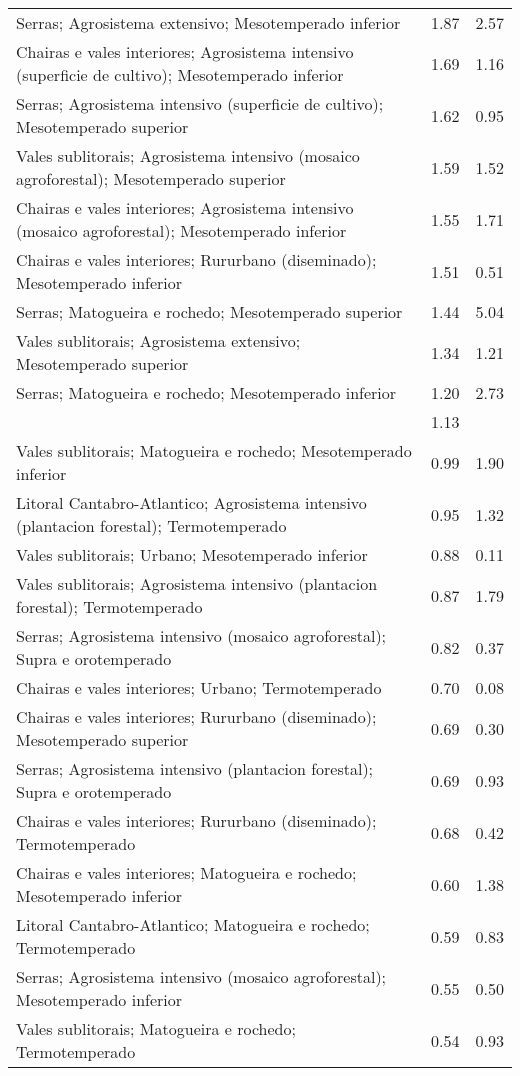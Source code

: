 \begin{table}[p]
\begin{tabular}{lrr}
  Serras; Agrosistema extensivo; Mesotemperado inferior & 1.87 & 2.57 \\ 
  Chairas e vales interiores; Agrosistema intensivo (superficie de cultivo); Mesotemperado inferior & 1.69 & 1.16 \\ 
  Serras; Agrosistema intensivo (superficie de cultivo); Mesotemperado superior & 1.62 & 0.95 \\ 
  Vales sublitorais; Agrosistema intensivo (mosaico agroforestal); Mesotemperado superior & 1.59 & 1.52 \\ 
  Chairas e vales interiores; Agrosistema intensivo (mosaico agroforestal); Mesotemperado inferior & 1.55 & 1.71 \\ 
  Chairas e vales interiores; Rururbano (diseminado); Mesotemperado inferior & 1.51 & 0.51 \\ 
  Serras; Matogueira e rochedo; Mesotemperado superior & 1.44 & 5.04 \\ 
  Vales sublitorais; Agrosistema extensivo; Mesotemperado superior & 1.34 & 1.21 \\ 
  Serras; Matogueira e rochedo; Mesotemperado inferior & 1.20 & 2.73 \\ 
   & 1.13 &  \\ 
  Vales sublitorais; Matogueira e rochedo; Mesotemperado inferior & 0.99 & 1.90 \\ 
  Litoral Cantabro-Atlantico; Agrosistema intensivo (plantacion forestal); Termotemperado & 0.95 & 1.32 \\ 
  Vales sublitorais; Urbano; Mesotemperado inferior & 0.88 & 0.11 \\ 
  Vales sublitorais; Agrosistema intensivo (plantacion forestal); Termotemperado & 0.87 & 1.79 \\ 
  Serras; Agrosistema intensivo (mosaico agroforestal); Supra e orotemperado & 0.82 & 0.37 \\ 
  Chairas e vales interiores; Urbano; Termotemperado & 0.70 & 0.08 \\ 
  Chairas e vales interiores; Rururbano (diseminado); Mesotemperado superior & 0.69 & 0.30 \\ 
  Serras; Agrosistema intensivo (plantacion forestal); Supra e orotemperado & 0.69 & 0.93 \\ 
  Chairas e vales interiores; Rururbano (diseminado); Termotemperado & 0.68 & 0.42 \\ 
  Chairas e vales interiores; Matogueira e rochedo; Mesotemperado inferior & 0.60 & 1.38 \\ 
  Litoral Cantabro-Atlantico; Matogueira e rochedo; Termotemperado & 0.59 & 0.83 \\ 
  Serras; Agrosistema intensivo (mosaico agroforestal); Mesotemperado inferior & 0.55 & 0.50 \\ 
  Vales sublitorais; Matogueira e rochedo; Termotemperado & 0.54 & 0.93 \\ 
   \hline
\end{tabular}
\end{table}
